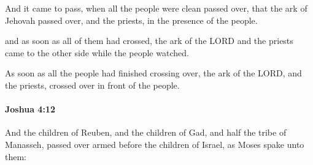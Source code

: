 			\begin{versebox}
					\item[BHS] 
					\item[ASV] And it came to pass, when all the people were clean passed over, that the ark of Jehovah passed over, and the priests, in the presence of the people.
					\item[NIV] and as soon as all of them had crossed, the ark of the LORD and the priests came to the other side while the people watched.
					\item[NRSV] As soon as all the people had finished crossing over, the ark of the LORD, and the priests, crossed over in front of the people.
			\end{versebox}

		\paragraph{Joshua 4:12} %
			\label{JOSHUA-4-12}

			And the children of Reuben, and the children of Gad, and half the tribe of Manasseh, passed over armed before the children of Israel, as Moses spake unto them:

